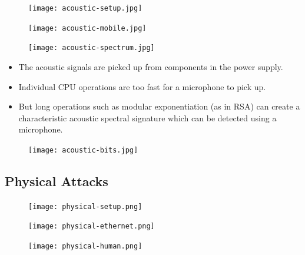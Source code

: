 \documentclass{beamer}
\begin{document}
\begin{frame}
  \begin{figure}
    \texttt{[image: acoustic-setup.jpg]}
  \end{figure}
  \begin{figure}
    \texttt{[image: acoustic-mobile.jpg]}
  \end{figure}
\end{frame}

\begin{frame}
  \begin{figure}
    \texttt{[image: acoustic-spectrum.jpg]}
  \end{figure}
  \begin{itemize}
    \item The acoustic signals are picked up from components in the power 
      supply.

    \item Individual CPU operations are too fast for a microphone to pick up.

    \item But long operations such as modular exponentiation (as in RSA) can 
      create a characteristic acoustic spectral signature which can be detected 
      using a microphone.
  \end{itemize}
\end{frame}

\begin{frame}
  \begin{figure}
    \texttt{[image: acoustic-bits.jpg]}
  \end{figure}
\end{frame}

\subsection{Physical Attacks}

\begin{frame}
  \begin{figure}
    \texttt{[image: physical-setup.png]}
  \end{figure}
\end{frame}

\begin{frame}
  \begin{figure}
    \texttt{[image: physical-ethernet.png]}
  \end{figure}
\end{frame}

\begin{frame}
  \begin{figure}
    \texttt{[image: physical-human.png]}
  \end{figure}
\end{frame}
\end{document}
